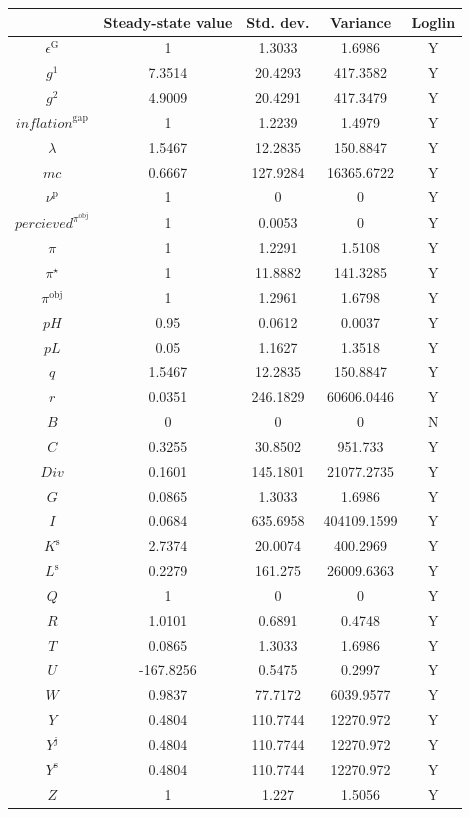 \begin{tabular}{c|c|c|c|c|}
  & Steady-state value & Std. dev. & Variance & Loglin\\
\hline
$\epsilon^{\mathrm{G}}$ & 1 & 1.3033 & 1.6986 & Y    \\
$g^{\mathrm{1}}$ & 7.3514 & 20.4293 & 417.3582 & Y    \\
$g^{\mathrm{2}}$ & 4.9009 & 20.4291 & 417.3479 & Y    \\
${i\!n\!f\!l\!a\!t\!i\!o\!n}^{\mathrm{gap}}$ & 1 & 1.2239 & 1.4979 & Y    \\
$\lambda$ & 1.5467 & 12.2835 & 150.8847 & Y    \\
${m\!c}$ & 0.6667 & 127.9284 & 16365.6722 & Y    \\
$\nu^{\mathrm{p}}$ & 1 & 0 & 0 & Y    \\
${p\!e\!r\!c\!i\!e\!v\!e\!d}^{\pi^{\mathrm{obj}}}$ & 1 & 0.0053 & 0 & Y    \\
$\pi$ & 1 & 1.2291 & 1.5108 & Y    \\
$\pi^{\star}$ & 1 & 11.8882 & 141.3285 & Y    \\
$\pi^{\mathrm{obj}}$ & 1 & 1.2961 & 1.6798 & Y    \\
${p\!H}$ & 0.95 & 0.0612 & 0.0037 & Y    \\
${p\!L}$ & 0.05 & 1.1627 & 1.3518 & Y    \\
$q$ & 1.5467 & 12.2835 & 150.8847 & Y    \\
$r$ & 0.0351 & 246.1829 & 60606.0446 & Y    \\
$B$ & 0 & 0 & 0 & N    \\
$C$ & 0.3255 & 30.8502 & 951.733 & Y    \\
${D\!i\!v}$ & 0.1601 & 145.1801 & 21077.2735 & Y    \\
$G$ & 0.0865 & 1.3033 & 1.6986 & Y    \\
$I$ & 0.0684 & 635.6958 & 404109.1599 & Y    \\
$K^{\mathrm{s}}$ & 2.7374 & 20.0074 & 400.2969 & Y    \\
$L^{\mathrm{s}}$ & 0.2279 & 161.275 & 26009.6363 & Y    \\
$Q$ & 1 & 0 & 0 & Y    \\
$R$ & 1.0101 & 0.6891 & 0.4748 & Y    \\
$T$ & 0.0865 & 1.3033 & 1.6986 & Y    \\
$U$ & -167.8256 & 0.5475 & 0.2997 & Y    \\
$W$ & 0.9837 & 77.7172 & 6039.9577 & Y    \\
$Y$ & 0.4804 & 110.7744 & 12270.972 & Y    \\
$Y^{\mathrm{j}}$ & 0.4804 & 110.7744 & 12270.972 & Y    \\
$Y^{\mathrm{s}}$ & 0.4804 & 110.7744 & 12270.972 & Y    \\
$Z$ & 1 & 1.227 & 1.5056 & Y    \\
\hline
\end{tabular}


